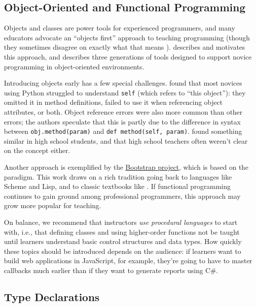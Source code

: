 \subsection*{Object-Oriented and Functional Programming}

Objects and classes are power tools for experienced programmers, and
many educators advocate an ``objects first'' approach to teaching
programming (though they sometimes disagree on exactly what that means
\cite{Benn2007b}).  \cite{Sorv2014} describes and motivates this
approach, and \cite{Koll2015} describes three generations of tools
designed to support novice programming in object-oriented
environments.

Introducing objects early has a few special challenges.
\cite{Mill2016b} found that most novices using Python struggled to
understand \texttt{self} (which refers to ``this object''): they
omitted it in method definitions, failed to use it when referencing
object attributes, or both.  Object reference errors were also more
common than other errors; the authors speculate that this is partly
due to the difference in syntax between \texttt{obj.method(param)} and
\texttt{def method(self, param)}.  \cite{Rago2017} found something
similar in high school students, and that high school teachers often
weren't clear on the concept either.

Another approach is exemplified by the
\href{http://www.bootstrapworld.org/}{Bootstrap project}, which is
based on the  paradigm.  This work draws on a rich tradition going
back to languages like Scheme and Lisp, and to classic textbooks like
\cite{Fell2001,Frie1995,Abel1996}.  If functional programming
continues to gain ground among professional programmers, this approach
may grow more popular for teaching.

On balance, we recommend that instructors \emph{use procedural
  languages} to start with, i.e., that defining classes and using
higher-order functions not be taught until learners understand basic
control structures and data types.  How quickly these topics should be
introduced depends on the audience: if learners want to build web
applications in JavaScript, for example, they're going to have to
master callbacks much earlier than if they want to generate reports
using C\#.

\subsection*{Type Declarations}

